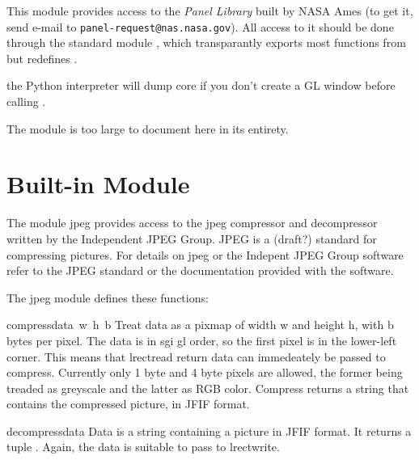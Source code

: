 This module provides access to the
{\em Panel Library}
built by NASA Ames (to get it, send e-mail to
{\tt panel-request@nas.nasa.gov}).
All access to it should be done through the standard module
,
which transparantly exports most functions from
but redefines
.

the Python interpreter will dump core if you don't create a GL window
before calling
.

The module is too large to document here in its entirety.

\section{Built-in Module }

The module jpeg provides access to the jpeg compressor and
decompressor written by the Independent JPEG Group. JPEG is a (draft?)
standard for compressing pictures.  For details on jpeg or the
Indepent JPEG Group software refer to the JPEG standard or the
documentation provided with the software.

The jpeg module defines these functions:

\renewcommand{\indexsubitem}{(in module jpeg)}
\begin{funcdesc}{compress}{data\, w\, h\, b}
Treat data as a pixmap of width w and height h, with b bytes per
pixel.  The data is in sgi gl order, so the first pixel is in the
lower-left corner. This means that lrectread return data can
immedeately be passed to compress.  Currently only 1 byte and 4 byte
pixels are allowed, the former being treaded as greyscale and the
latter as RGB color.  Compress returns a string that contains the
compressed picture, in JFIF format.
\end{funcdesc}

\begin{funcdesc}{decompress}{data}
Data is a string containing a picture in JFIF format. It returns a
tuple
.
Again, the data is suitable to pass to lrectwrite.
\end{funcdesc}

